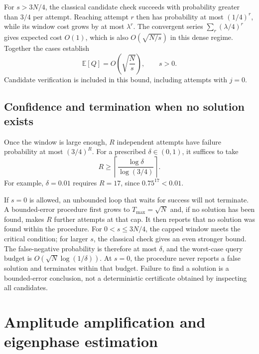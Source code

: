 \documentclass[11pt,oneside,openany]{book}
\theoremstyle{definition}
\begin{document}
For $s>3N/4$, the classical candidate check succeeds with probability greater than $3/4$ per attempt. Reaching attempt $r$ then has probability at most $(1/4)^r$, while its window cost grows by at most $\lambda^r$. The convergent series $\sum_r(\lambda/4)^r$ gives expected cost $O(1)$, which is also $O(\sqrt{N/s})$ in this dense regime. Together the cases establish
\begin{equation}
 \mathbb E[Q]=O\!\left(\sqrt{\frac Ns}\right),\qquad s>0.
 \label{eq:search-unknown-complexity}
\end{equation}
Candidate verification is included in this bound, including attempts with $j=0$.

\subsection{Confidence and termination when no solution exists}

Once the window is large enough, $R$ independent attempts have failure probability at most $(3/4)^R$. For a prescribed $\delta\in(0,1)$, it suffices to take
\begin{equation}
 R\geq\left\lceil\frac{\log\delta}{\log(3/4)}\right\rceil.
\end{equation}
For example, $\delta=0.01$ requires $R=17$, since $0.75^{17}<0.01$.

If $s=0$ is allowed, an unbounded loop that waits for success will not terminate. A bounded-error procedure first grows to $T_{\max}=\sqrt N$ and, if no solution has been found, makes $R$ further attempts at that cap. It then reports that no solution was found within the procedure. For $0<s\le3N/4$, the capped window meets the critical condition; for larger $s$, the classical check gives an even stronger bound. The false-negative probability is therefore at most $\delta$, and the worst-case query budget is $O(\sqrt N\log(1/\delta))$. At $s=0$, the procedure never reports a false solution and terminates within that budget. Failure to find a solution is a bounded-error conclusion, not a deterministic certificate obtained by inspecting all candidates.

\section{Amplitude amplification and eigenphase estimation}
\end{document}
